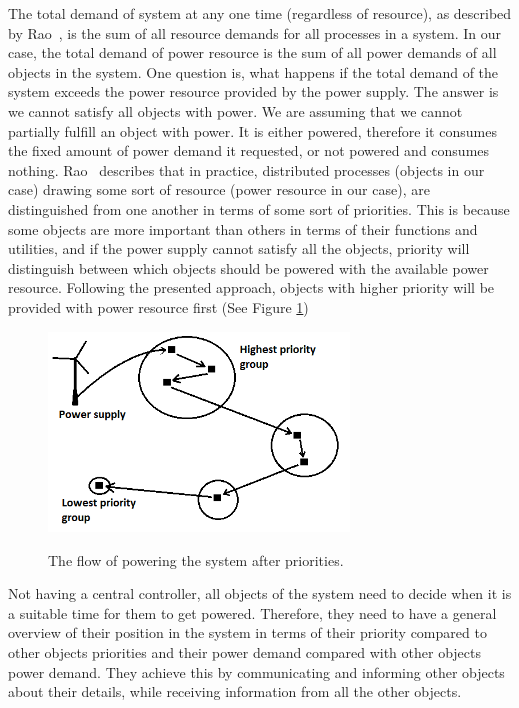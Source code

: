 \documentclass[../main/IoT.tex]{subfiles}
\begin{document}
The total demand of system at any one time (regardless of resource), as described by Rao~\cite{rao2011foundation}, is the sum of all resource demands for all processes in a system. In our case, the total demand of power resource is the sum of all power demands of all objects in the system. One question is, what happens if the total demand of the system exceeds the power resource provided by the power supply. The answer is we cannot satisfy all objects with power. We are assuming that we cannot partially fulfill an object with power. It is either powered, therefore it consumes the fixed amount of power demand it requested, or not powered and consumes nothing. Rao~\cite{rao2011foundation} describes that in practice, distributed processes (objects in our case) drawing some sort of resource (power resource in our case), are distinguished from one another in terms of some sort of priorities. This is because some objects are more important than others in terms of their functions and utilities, and if the power supply cannot satisfy all the objects, priority will distinguish between which objects should be powered with the available power resource. Following the presented approach, objects with higher priority will be provided with power resource first (See Figure \ref{fig1})
\begin{figure}[h]
  \centering
  \includegraphics[width=80mm]{../figs/model.png}\\
  \caption{The flow of powering the system after priorities.}\label{fig1}
\end{figure}

Not having a central controller, all objects of the system need to decide when it is a suitable time for them to get powered. Therefore, they need to have a general overview of their position in the system in terms of their priority compared to other objects priorities and their power demand compared with other objects power demand. They achieve this by communicating and informing other objects about their details, while receiving information from all the other objects.
\end{document}
